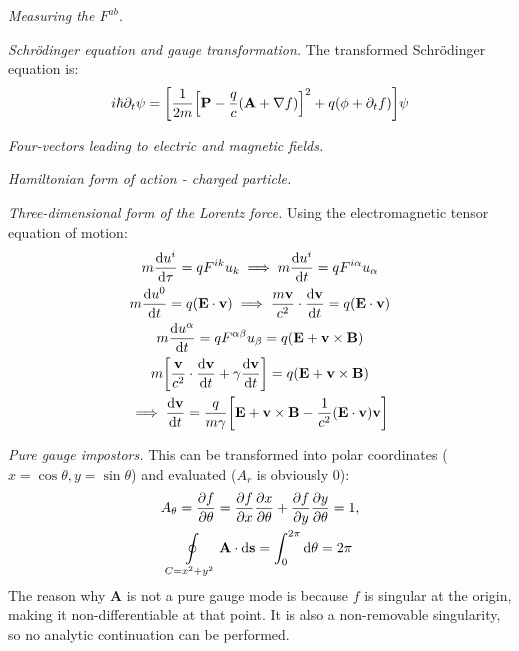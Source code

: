 \documentclass{report}
\begin{document}
\begin{subquests}
	\item \emph{Measuring the $F^{ab}$.}

	\item \emph{Schr\"odinger equation and gauge transformation.}
	The transformed Schr\"odinger equation is:
	\begin{gather*}
		i\hbar\partial_t \psi = \bqty{\frac{1}{2m}\bqty{\mathbf{P} - \frac{q}{c}\pqty{\mathbf A + \nabla f}}^2 + q\pqty{\phi + \partial_t f}}\psi
	\end{gather*}

	\item \emph{Four-vectors leading to electric and magnetic fields.}

	\item \emph{Hamiltonian form of action - charged particle.}

	\item \emph{Three-dimensional form of the Lorentz force.}
	Using the electromagnetic tensor equation of motion:
	\begin{gather*}
		m\dv{u^i}{\tau} = q F^{ik}u_k \implies m\dv{u^i}{t} = q F^{i\alpha}u_{\alpha} \\
		m\dv{u^0}{t} = q\pqty{\mathbf E \cdot \mathbf v} \implies \frac{m\mathbf v}{c^2}\cdot\dv{\mathbf v}{t} = q\pqty{\mathbf E \cdot \mathbf v} \\
		m\dv{u^{\alpha}}{t} = q F^{\alpha\beta}u_{\beta} = q\pqty{\mathbf E + \mathbf v \times \mathbf B} \\
		m\bqty{\frac{\mathbf v}{c^2}\cdot \dv{\mathbf v}{t} + \gamma \dv{\mathbf v}{t}} = q\pqty{\mathbf E + \mathbf v \times \mathbf B} \\
		\implies \dv{\mathbf v}{t} = \frac{q}{m\gamma}\bqty{\mathbf E + \mathbf v \times \mathbf B - \frac{1}{c^2}\pqty{\mathbf E \cdot \mathbf v}\mathbf v}
	\end{gather*}

	\item \emph{Pure gauge impostors.}
	This can be transformed into polar coordinates ($x = \cos\theta, y = \sin\theta $) and evaluated ($A_r$ is obviously 0):
	\begin{gather*}
		A_{\theta} = \pdv{f}{\theta} = \pdv{f}{x}\pdv{x}{\theta} + \pdv{f}{y}\pdv{y}{\theta} = 1,\\
		\oint\limits_{C = x^2 + y^2} \mathbf A \cdot \dd{\mathbf s} = \int_0^{2\pi}\dd{\theta} = 2\pi 
	\end{gather*}
	The reason why $\mathbf A$ is not a pure gauge mode is because $f$ is singular at the origin, making it non-differentiable at that point. It is also a non-removable singularity, so no analytic continuation can be performed.


\end{subquests}
\end{document}

